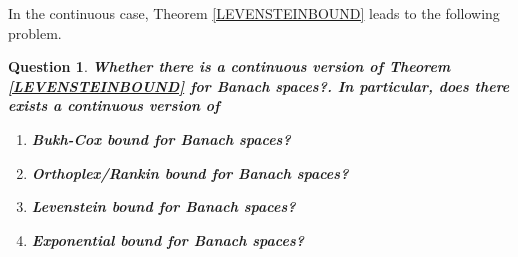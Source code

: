 \documentclass{amsart}
\newtheorem{question}[theorem]{Question}
\begin{document}
   In the continuous case, Theorem \ref{LEVENSTEINBOUND}   leads to the following problem.
  \begin{question}
 \textbf{ Whether there is a  continuous version of Theorem \ref{LEVENSTEINBOUND} for Banach spaces?. In particular, does there exists a continuous version of }
  	\begin{enumerate}[\upshape(i)]
  		\item  \textbf{ Bukh-Cox bound for Banach spaces?}
  		\item  \textbf{ Orthoplex/Rankin bound for Banach spaces?}
  		\item  \textbf{ Levenstein bound for Banach spaces?}
  		\item  \textbf{ Exponential bound for Banach spaces?}
  	\end{enumerate}		
  \end{question}
  
  
  
  
  
\end{document}
